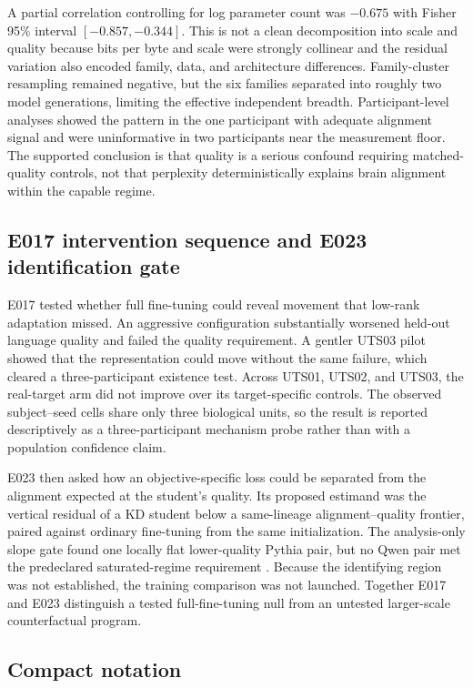 A partial correlation controlling for log parameter count was $-0.675$ with Fisher 95\% interval $[-0.857,-0.344]$. 
This is not a clean decomposition into scale and quality because bits per byte and scale were strongly collinear and the residual variation also encoded family, data, and architecture differences.
Family-cluster resampling remained negative, but the six families separated into roughly two model generations, limiting the effective independent breadth.
Participant-level analyses showed the pattern in the one participant with adequate alignment signal and were uninformative in two participants near the measurement floor.
The supported conclusion is that quality is a serious confound requiring matched-quality controls, not that perplexity deterministically explains brain alignment within the capable regime.

\subsection{E017 intervention sequence and E023 identification gate}
\label{sec:e017-detail}

E017 tested whether full fine-tuning could reveal movement that low-rank adaptation missed.
An aggressive configuration substantially worsened held-out language quality and failed the quality requirement.
A gentler UTS03 pilot showed that the representation could move without the same failure, which cleared a three-participant existence test.
Across UTS01, UTS02, and UTS03, the real-target arm did not improve over its target-specific controls. 
The observed subject--seed cells share only three biological units, so the result is reported descriptively as a three-participant mechanism probe rather than with a population confidence claim.

E023 then asked how an objective-specific loss could be separated from the alignment expected at the student's quality.
Its proposed estimand was the vertical residual of a KD student below a same-lineage alignment--quality frontier, paired against ordinary fine-tuning from the same initialization.
The analysis-only slope gate found one locally flat lower-quality Pythia pair, but no Qwen pair met the predeclared saturated-regime requirement .
Because the identifying region was not established, the training comparison was not launched.
Together E017 and E023 distinguish a tested full-fine-tuning null from an untested larger-scale counterfactual program.

\subsection{Compact notation}

